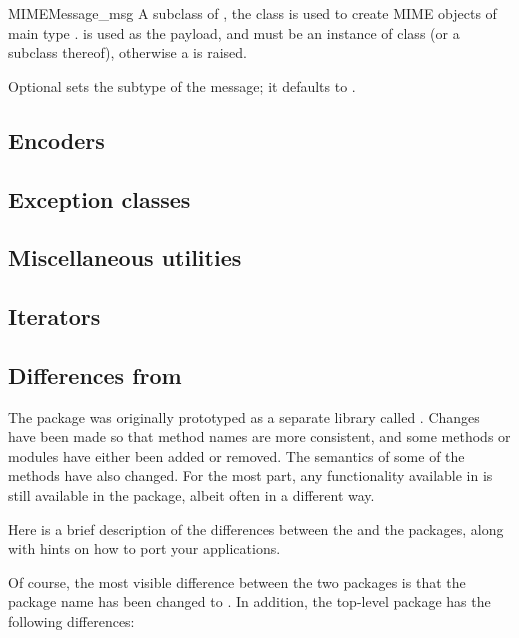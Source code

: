 \begin{classdesc}{MIMEMessage}{_msg}
A subclass of , the  class is used to
create MIME objects of main type .   is used as
the payload, and must be an instance of class  (or a
subclass thereof), otherwise a  is raised.

Optional  sets the subtype of the message; it defaults
to .
\end{classdesc}

\subsection{Encoders}


\subsection{Exception classes}


\subsection{Miscellaneous utilities}


\subsection{Iterators}


\subsection{Differences from }

The  package was originally prototyped as a separate
library called
.
Changes have been made so that
method names are more consistent, and some methods or modules have
either been added or removed.  The semantics of some of the methods
have also changed.  For the most part, any functionality available in
 is still available in the  package,
albeit often in a different way.

Here is a brief description of the differences between the
 and the  packages, along with hints on
how to port your applications.

Of course, the most visible difference between the two packages is
that the package name has been changed to .  In
addition, the top-level package has the following differences:

